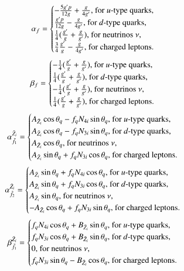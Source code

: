 \documentclass[final,3p,times,pdflatex]{elsarticle}
\begin{document}
\begin{equation}
\alpha_f = \begin{cases}
-{5g'p \over 12g} + {g \over 4g'}, $ for $u$-type quarks,$ \\
{g'p \over 12g} - {g \over 4g'}, $ for $d$-type quarks,$ \\
{1\over 4}({g' \over g} + {g \over g'}), $ for neutrinos $ \nu$,$ \\
{3 \over 4}{g' \over g} - {g \over 4 g'}, $ for charged leptons$. 
\end{cases}
\end{equation}
\begin{equation}
\beta_f = \begin{cases}
-{1 \over 4}({g' \over g} + {g \over g'}), $ for $u$-type quarks,$ \\
{1 \over 4}({g' \over g} + {g \over g'}), $ for $d$-type quarks,$ \\
-{1 \over 4}({g' \over g} + {g \over g'}), $ for neutrinos $ \nu$,$ \\
{1 \over 4}({g' \over g} + {g \over g'}), $ for charged leptons$. 
\end{cases}
\end{equation}
\begin{equation}
{\alpha_{\tilde{f}_1}^{\tilde{Z}_i}} = \begin{cases}
A_{\tilde{Z}_i}\cos\theta_q - f_{q}N_{4i}\sin\theta_q, $ for $u$-type quarks,$ \\
A_{\tilde{Z}_i}\cos\theta_q - f_{q}N_{3i}\sin\theta_q, $ for $d$-type quarks,$ \\
A_{\tilde{Z}_i}\cos\theta_q, $ for neutrinos $ \nu$,$ \\
A_{\tilde{Z}_i}\sin\theta_q + f_{q}N_{3i}\cos\theta_q, $ for charged leptons$. 
\end{cases}
\end{equation}
\begin{equation}
{\alpha_{\tilde{f}_2}^{\tilde{Z}_i}} = \begin{cases}
A_{\tilde{Z}_i}\sin\theta_q + f_{q}N_{4i}\cos\theta_q, $ for $u$-type quarks,$ \\
A_{\tilde{Z}_i}\sin\theta_q + f_{q}N_{3i}\cos\theta_q, $ for $d$-type quarks,$ \\
A_{\tilde{Z}_i}\sin\theta_q, $ for neutrinos $ \nu$,$ \\
-A_{\tilde{Z}_i}\cos\theta_q + f_{q}N_{3i}\sin\theta_q, $ for charged leptons$. 
\end{cases}
\end{equation}
\begin{equation}
{\beta_{\tilde{f}_1}^{\tilde{Z}_i}} = \begin{cases}
f_{q}N_{4i}\cos\theta_q + B_{\tilde{Z}_i}\sin\theta_q, $ for $u$-type quarks,$ \\
f_{q}N_{3i}\cos\theta_q + B_{\tilde{Z}_i}\sin\theta_q, $ for $d$-type quarks,$ \\
0, $ for neutrinos $ \nu$,$ \\
f_{q}N_{3i}\sin\theta_q - B_{\tilde{Z}_i}\cos\theta_q, $ for charged leptons$. 
\end{cases}
\end{equation}
\end{document}
